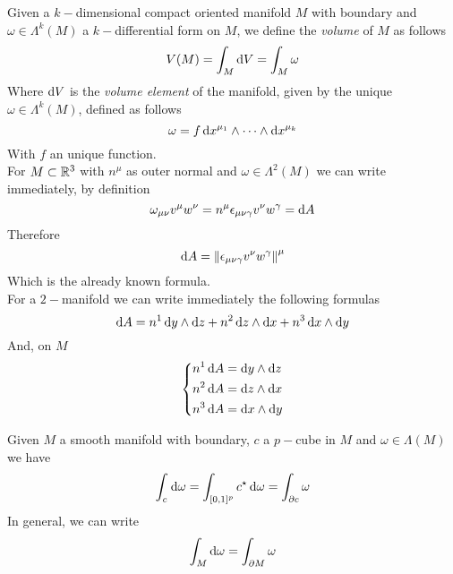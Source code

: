 \documentclass[../complete.tex]{subfiles}
\begin{document}
\begin{dfn}
	Given a $k-$dimensional compact oriented manifold $M$ with boundary and $\omega\in\Lambda^k(M)$ a $k-$differential form on $M$, we define the \textit{volume} of $M$ as follows
	\begin{equation}
		V(M)=\int_M\operatorname{d\!} V=\int_M\omega
		\label{eq:volumemanifold}
	\end{equation}
	Where $\operatorname{d\!} V$ is the \textit{volume element} of the manifold, given by the unique $\omega\in\Lambda^k(M)$, defined as follows
	\begin{equation}
		\omega=f\operatorname{d\!} x^{\mu_1}\wedge\cdots\wedge\operatorname{d\!} x^{\mu_k}
		\label{eq:kdiffformm}
	\end{equation}
	With $f$ an unique function.\\
	For $M\subset\mathbb{R}^3$ with $n^\mu$ as outer normal and $\omega\in\Lambda^2(M)$ we can write immediately, by definition
	\begin{equation*}
		\omega_{\mu\nu}v^\mu w^\nu=n^\mu\epsilon_{\mu\nu\gamma}v^\nu w^\gamma=\operatorname{d\!} A
	\end{equation*}
	Therefore
	\begin{equation}
		\operatorname{d\!} A=\norm{\epsilon_{\mu\nu\gamma}v^\nu w^\gamma}^\mu
		\label{eq:diffar2}
	\end{equation}
	Which is the already known formula.\\
	For a $2-$manifold we can write immediately the following formulas
	\begin{equation}
		\operatorname{d\!} A=n^1\operatorname{d\!} y\wedge\operatorname{d\!} z+n^2\operatorname{d\!} z\wedge\operatorname{d\!} x+n^3\operatorname{d\!} x\wedge\operatorname{d\!} y
		\label{eq:diffar3}
	\end{equation}
	And, on $M$
	\begin{equation}
		\left\{\begin{aligned}
				n^1\diff A&=\diff y\wedge\diff z\\
				n^2\diff A&=\diff z\wedge\diff x\\
				n^3\diff A&=\diff x\wedge\diff y
		\end{aligned}\right.
		\label{eq:formulasfordiffa}
	\end{equation}
\end{dfn}
\begin{thm}
	Given $M$ a smooth manifold with boundary, $c$ a $p-$cube in $M$ and $\omega\in\Lambda(M)$ we have
	\begin{equation}
		\int_{c}^{}\operatorname{d\!}\omega=\int_{[0,1]^p}c^\star\operatorname{d\!}\omega=\int_{\partial c}\omega
		\label{eq:stokestheorem}
	\end{equation}
	In general, we can write
	\begin{equation}
		\int_M\operatorname{d\!}\omega=\int_{\partial M}\omega
		\label{eq:ggso}
	\end{equation}
\end{thm}
\end{document}
